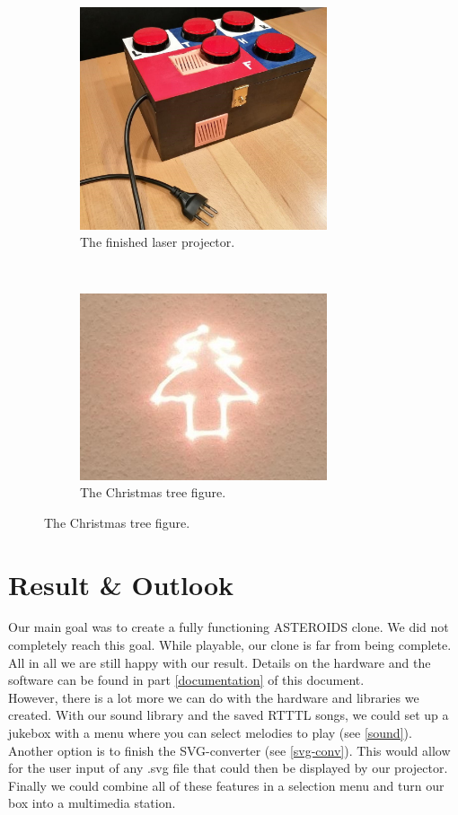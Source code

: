 \documentclass{report}
\begin{document}
\begin{figure}[h]
	\begin{subfigure}[b]{0.45\textwidth}
		\centering
		\includegraphics[width=0.8\textwidth]{box.jpg}
		\caption{The finished laser projector.}
		\label{img:box}
	\end{subfigure}
	~
	\begin{subfigure}[b]{0.45\textwidth}
		\centering
		\includegraphics[width=0.8\textwidth]{tree.jpg}
		\caption{The Christmas tree figure.}
		\label{img:tree}
	\end{subfigure}
\end{figure}
\chapter{Result \& Outlook}
Our main goal was to create a fully functioning ASTEROIDS clone. We did not completely reach this goal. While playable, our clone is far from being complete. All in all we are still happy with our result. Details on the hardware and the software can be found in part \ref{documentation} of this document. \\
However, there is a lot more we can do with the hardware and libraries we created. With our sound library and the saved RTTTL songs, we could set up a jukebox with a menu where you can select melodies to play (see \ref{sound}). \\
Another option is to finish the SVG-converter (see \ref{svg-conv}). This would allow for the user input of any .svg file that could then be displayed by our projector. \\
Finally we could combine all of these features in a selection menu and turn our box into a multimedia station.
\end{document}
